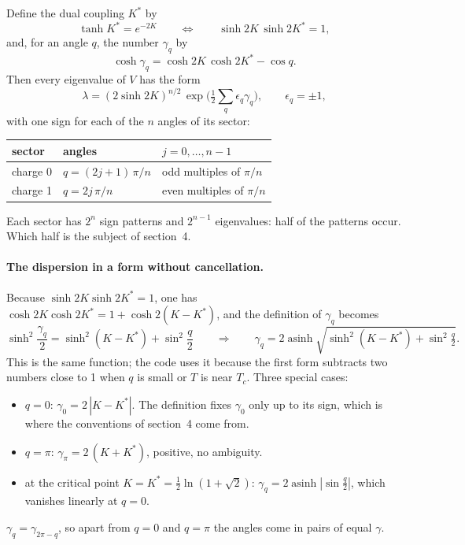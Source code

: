 \documentclass[11pt]{article}
\DeclareMathOperator{\asinh}{asinh}
\begin{document}
Define the dual coupling $K^*$ by
\begin{equation}
\tanh K^* = e^{-2K} \qquad\Longleftrightarrow\qquad \sinh 2K \, \sinh 2K^* = 1 ,
\end{equation}
and, for an angle $q$, the number $\gamma_q$ by
\begin{equation}
\cosh \gamma_q = \cosh 2K \, \cosh 2K^* - \cos q .
\end{equation}
Then every eigenvalue of $V$ has the form
\begin{equation}
\lambda = (2 \sinh 2K)^{n/2} \, \exp\Big( \tfrac12 \sum_{q} \epsilon_q \gamma_q \Big),
\qquad \epsilon_q = \pm 1 ,
\end{equation}
with one sign for each of the $n$ angles of its sector:
\begin{center}\begin{tabular}{lll}
\toprule
sector & angles & $j = 0, \dots, n-1$ \\
\midrule
charge 0 & $q = (2j+1)\,\pi / n$ & odd multiples of $\pi/n$ \\
charge 1 & $q = 2j\,\pi / n$ & even multiples of $\pi/n$ \\
\bottomrule
\end{tabular}\end{center}
Each sector has $2^n$ sign patterns and $2^{n-1}$ eigenvalues: half of the patterns occur.
Which half is the subject of section~4.

\paragraph{The dispersion in a form without cancellation.}  Because $\sinh 2K \sinh 2K^* = 1$,
one has $\cosh 2K \cosh 2K^* = 1 + \cosh 2(K - K^*)$, and the definition of $\gamma_q$ becomes
\begin{equation}
\sinh^2 \frac{\gamma_q}{2} = \sinh^2 (K - K^*) + \sin^2 \frac{q}{2}
\qquad\Longrightarrow\qquad
\gamma_q = 2 \asinh \sqrt{ \sinh^2 (K - K^*) + \sin^2 \tfrac{q}{2} } .
\end{equation}
This is the same function; the code uses it because the first form subtracts two numbers close
to 1 when $q$ is small or $T$ is near $T_c$.  Three special cases:
\begin{itemize}
\item $q = 0$: $\gamma_0 = 2\,|K - K^*|$.  The definition fixes $\gamma_0$ only up to its sign,
  which is where the conventions of section~4 come from.
\item $q = \pi$: $\gamma_\pi = 2\,(K + K^*)$, positive, no ambiguity.
\item at the critical point $K = K^* = \tfrac12 \ln(1 + \sqrt2)$:
  $\gamma_q = 2 \asinh |\sin \tfrac{q}{2}|$, which vanishes linearly at $q = 0$.
\end{itemize}
$\gamma_q = \gamma_{2\pi - q}$, so apart from $q = 0$ and $q = \pi$ the angles come in pairs of
equal $\gamma$.
\end{document}
